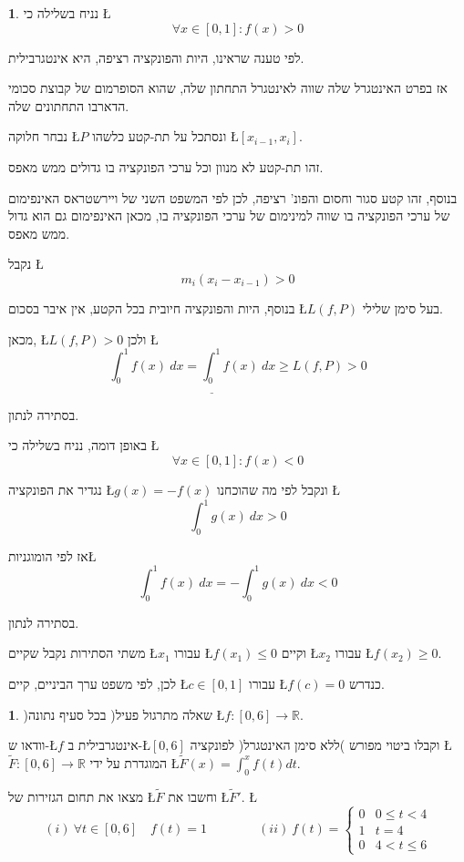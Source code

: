 \documentclass[english,hebrew]{article}
\theoremstyle{plain}
\theoremstyle{definition}
\newtheorem{xca}[thm]{\protect\exercisename}
\theoremstyle{definition}
\newtheorem*{sol*}{\protect\solutionname}
\providecommand{\exercisename}{תרגיל}
\providecommand{\solutionname}{פתרון}
\begin{document}
\begin{sol*}
נניח בשלילה כי \L{%
\[
\forall x\in\left[0,1\right]:f(x)>0
\]
}%

לפי טענה שראינו, היות והפונקציה רציפה, היא אינטגרבילית.

אז בפרט האינטגרל שלה שווה לאינטגרל התחתון שלה, שהוא הסופרמום של קבוצת
סכומי הדארבו התחתונים שלה.

נבחר חלוקה \L{$P$} ונסתכל על תת-קטע כלשהו \L{$\left[x_{i-1},x_{i}\right]$}. 

זהו תת-קטע לא מנוון וכל ערכי הפונקציה בו גדולים ממש מאפס.

בנוסף, זהו קטע סגור וחסום והפונ' רציפה, לכן לפי המשפט השני של ויירשטראס
האינפימום של ערכי הפונקציה בו שווה למינימום של ערכי הפונקציה בו, מכאן
האינפימום גם הוא גדול ממש מאפס.

נקבל \L{%
\[
m_{i}\left(x_{i}-x_{i-1}\right)>0
\]
}%

בנוסף, היות והפונקציה חיובית בכל הקטע, אין איבר בסכום \L{$L\left(f,P\right)$}
בעל סימן שלילי.

מכאן, \L{$L\left(f,P\right)>0$} ולכן \L{%
\[
\int_{0}^{1}f(x)\ dx=\underline{\int_{0}^{1}}f(x)\ dx\ge L\left(f,P\right)>0
\]
}%

בסתירה לנתון.

באופן דומה, נניח בשלילה כי \L{%
\[
\forall x\in\left[0,1\right]:f(x)<0
\]
}%

נגדיר את הפונקציה \L{$g(x)=-f(x)$} ונקבל לפי מה שהוכחנו \L{%
\[
\int_{0}^{1}g(x)\ dx>0
\]
}%

אז לפי הומוגניות\L{%
\[
\int_{0}^{1}f(x)\ dx=-\int_{0}^{1}g(x)\ dx<0
\]
}%

בסתירה לנתון.

משתי הסתירות נקבל שקיים \L{$x_{1}$} עבורו \L{$f\left(x_{1}\right)\le0$}
וקיים \L{$x_{2}$} עבורו \L{$f\left(x_{2}\right)\ge0$}.

לכן, לפי משפט ערך הביניים, קיים \L{$c\in\left[0,1\right]$} עבורו
\L{$f\left(c\right)=0$} כנדרש.
\end{sol*}
\begin{xca}
)שאלה מתרגול פעיל( בכל סעיף נתונה \L{$f:[0,6]\to\mathbb{R}$}.

וודאו ש-\L{$f$} אינטגרבילית ב-\L{$[0,6]$} וקבלו ביטוי מפורש )ללא
סימן האינטגרל( לפונקציה \L{$\tilde{F}:[0,6]\to\mathbb{R}$} המוגדרת
על ידי \L{$\tilde{F}(x)=\int_{0}^{x}f(t)dt$}.

מצאו את תחום הגזירות של \L{$\tilde{F}$} וחשבו את \L{$\tilde{F}'$}.
\L{%
\[
(i)\ \forall t\in[0,6]\quad f(t)=1\qquad\qquad(ii)\ f(t)=\begin{cases}
0 & 0\le t<4\\
1 & t=4\\
0 & 4<t\le6
\end{cases}
\]
}%
\end{xca}
\end{document}
